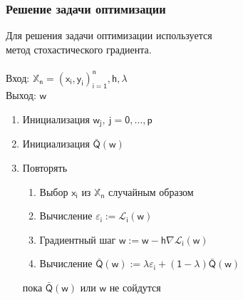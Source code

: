 \documentclass[unicode, notheorems]{beamer}
\begin{document}
\begin{frame}
\frametitle{Решение задачи оптимизации}
Для решения задачи оптимизации используется \\ \alert{метод стохастического градиента}. \\
~\\
Вход: $\mathbb{X}_\mathsf{n}=\mathsf{(x_i,y_i)_{i=1}^n, h, \lambda}$ \\
Выход: $\mathsf{w}$
\begin{enumerate}
	\item Инициализация $\mathsf{w_j,~ j=0,\ldots,p}$ \\
	\item Инициализация $\mathsf{\bar{Q}(w)}$ \\
	\item {Повторять
		\begin{enumerate}
			\item Выбор $\mathsf{x_i}$ из $\mathbb{X}_\mathsf{n}$ случайным образом \\
			\item Вычисление $\mathsf{\varepsilon_i := \mathcal{L}_i(w)}$ \\
			\item Градиентный шаг $\mathsf{w:=w-h\nabla\mathcal{L}_i(w) }$ \\
			\item Вычисление $\mathsf{\bar{Q}(w):=\lambda\varepsilon_i+(1-\lambda)\bar{Q}(w)}$ \\
		\end{enumerate} 
	пока $\mathsf{\bar{Q}(w)}$ или $\mathsf{w}$ не сойдутся
	}
\end{enumerate}


\end{frame}

\end{document}
